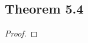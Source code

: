 \documentclass[../../main.tex]{subfiles}
\begin{document}
\subsection{Theorem 5.4}
\begin{wts}

\end{wts}
\begin{proof}

\end{proof}
\end{document}
